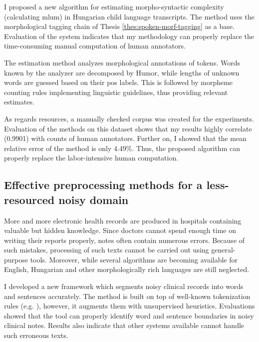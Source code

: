 \begin{core}
\begin{thesis}
\label{thes:mlu-estimation}
I proposed a new algorithm for estimating morpho-syntactic complexity (calculating \acrlong{mlum}) in Hungarian child language transcripts.
The method uses the morphological tagging chain of Thesis \ref{thes:spoken-morf-tagging} as a base.
Evaluation of the system indicates that my methodology can properly replace the time-consuming manual computation of human annotators.
\end{thesis}

\begin{pub}
\cite{Matyus2014,Orosz2014c}
\end{pub}
\end{core}

The estimation method analyzes morphological annotations of tokens.
Words known by the analyzer are decomposed by Humor, while lengths of unknown words are guessed based on their \acrshort{pos} labels.
This is followed by morpheme counting rules implementing linguistic guidelines, thus providing relevant estimates.

As regards resources, a manually checked corpus was created for the experiments.
Evaluation of the methods on this dataset shows that my results highly correlate (0.9901) with counts of human annotators.
Further on, I showed that the mean relative error of the method is only 4.49\%.
Thus, the proposed algorithm can properly replace the labor-intensive human computation.

\subsection{Effective preprocessing methods for a less-resourced noisy domain}
\label{thes:clin}

More and more electronic health records are produced in hospitals containing valuable but hidden knowledge.
Since doctors cannot spend enough time on writing their reports properly, notes often contain numerous errors.
Because of such mistakes, processing of such texts cannot be carried out using general-purpose tools.
Moreover, while several algorithms are becoming available for English, Hungarian and other morphologically rich languages are still neglected.

\begin{core}
\begin{thesis}%
\label{thes:clin-segment}
I developed a new framework which segments noisy clinical records into words and sentences accurately.
The method is built on top of well-known tokenization rules (e.g. \cite{Halacsy2004}), however, it augments them with unsupervised heuristics.
Evaluations showed that the tool can properly identify word and sentence boundaries in noisy clinical notes. 
Results also indicate that other systems available cannot handle such erroneous texts.
\end{thesis}

\begin{pub}
\cite{Orosz2013d,Orosz2014a,Orosz2014x}
\end{pub}
\end{core}

